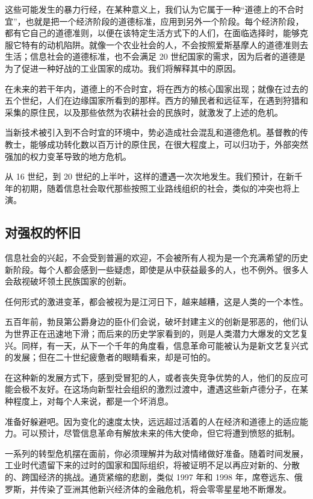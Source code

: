 这些可能发生的暴力行经，在某种意义上，我们认为它属于一种“道德上的不合时宜”，也就是把一个经济阶段的道德标准，应用到另外一个阶段。每个经济阶段，都有它自己的道德准则，以便在该特定生活方式下的人们，在面临选择时，能够克服它特有的动机陷阱。就像一个农业社会的人，不会按照爱斯基摩人的道德准则去生活；信息社会的道德标准，也不会满足 20 世纪国家的需求，因为后者的道德是为了促进一种好战的工业国家的成功。我们将解释其中的原因。


在未来的若干年内，道德上的不合时宜，将在西方的核心国家出现；就像在过去的五个世纪，人们在边缘国家所看到的那样。西方的殖民者和远征军，在遇到狩猎和采集的原住民，以及那些依然为农耕社会的民族时，就激发了上述的危机。


当新技术被引入到不合时宜的环境中，势必造成社会混乱和道德危机。基督教的传教士，能够成功转化数以百万计的原住民，在很大程度上，可以归功于，外部突然强加的权力变革导致的地方危机。


从 16 世纪，到 20 世纪的上半叶，这样的遭遇一次次地发生。我们预计，在新千年的初期，随着信息社会取代那些按照工业路线组织的社会，类似的冲突也将上演。


\subsection{对强权的怀旧}
信息社会的兴起，不会受到普遍的欢迎，不会被所有人视为是一个充满希望的历史新阶段。每个人都会感到一些疑虑，即使是从中获益最多的人，也不例外。很多人会敌视破坏领土民族国家的创新。


任何形式的激进变革，都会被视为是江河日下，越来越糟，这是人类的一个本性。


五百年前，勃艮第公爵身边的臣仆们会说，破坏封建主义的创新是邪恶的，他们认为世界正在迅速地下滑；而后来的历史学家看到的，则是人类潜力大爆发的文艺复兴。同样，有一天，从下一个千年的角度看，信息革命可能被认为是新文艺复兴式的发展；但在二十世纪疲惫者的眼睛看来，却是可怕的。


在这种新的发展方式下，感到受冒犯的人，或者丧失竞争优势的人，他们的反应可能会极不友好。在这场向新型社会组织的激烈过渡中，遭遇这些新卢德分子，在某种程度上，对每个人来说，都是一个坏消息。


准备好躲避吧。因为变化的速度太快，远远超过活着的人在经济和道德上的适应能力。可以预计，尽管信息革命有解放未来的伟大使命，但它将遭到愤怒的抵制。


一系列的转型危机摆在面前，你必须理解并为敌对情绪做好准备。随着时间发展，工业时代遗留下来的过时的国家和国际组织，将被证明不足以再应对新的、分散的、跨国经济的挑战。通货紧缩的悲剧，类似 1997 年和 1998 年，席卷远东、俄罗斯，并传染了亚洲其他新兴经济体的金融危机，将会零零星星地不断爆发。



